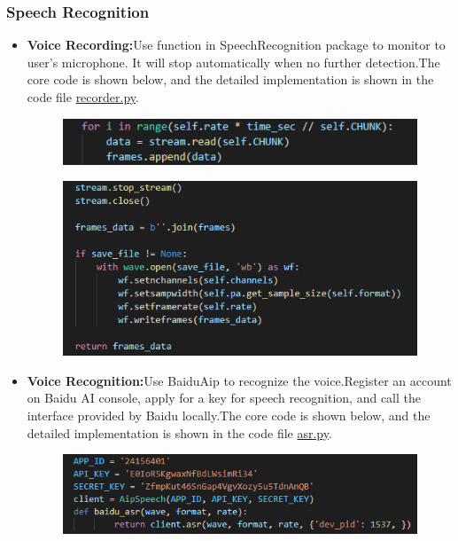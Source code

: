 \documentclass{hci}
\begin{document}
\subsubsection{Speech Recognition}
\begin{itemize}
	\item \textbf{Voice Recording:}Use function in SpeechRecognition package to monitor to user's microphone. It will stop automatically when no further detection.The core code is shown below, and the detailed implementation is shown in the code file \underline{recorder.py}.
    \begin{figure}[h!]
    	\centering
    	\includegraphics[width=0.9\linewidth]{../picture/8}
    	\label{figure8}
    \end{figure}
	\newpage
	\begin{figure}[htb]
		\centering
		\includegraphics[width=0.9\linewidth]{../picture/9}
		\label{figure9}
	\end{figure}
	\item \textbf{Voice Recognition:}Use BaiduAip to recognize the voice.Register an account on Baidu AI console, apply for a key for speech recognition, and call the interface provided by Baidu locally.The core code is shown below, and the detailed implementation is shown in the code file \underline{asr.py}.
	\begin{figure}[htb]
		\centering
		\includegraphics[width=0.9\linewidth]{../picture/10}
		\label{figure10}
	\end{figure}
\end{itemize}
\end{document}
